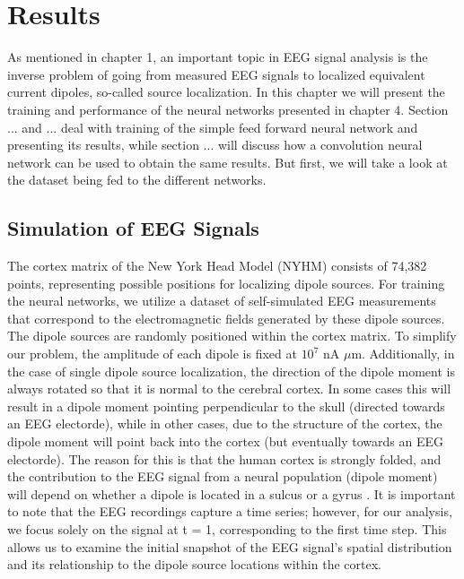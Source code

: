 \documentclass[a4paper, UKenglish, 11pt]{uiomaster}
\begin{document}
\chapter{Results}
As mentioned in chapter 1, an important topic in EEG signal analysis is the inverse problem of going from measured EEG signals to localized equivalent current dipoles, so-called source localization. In this chapter we will present the training and performance of the neural networks presented in chapter 4. Section ... and ... deal with training of the simple feed forward neural network and presenting its results, while section ... will discuss how a convolution neural network can be used to obtain the same results. But first, we will take a look at the dataset being fed to the different networks.

\section{Simulation of EEG Signals}
The cortex matrix of the New York Head Model (NYHM) consists of 74,382 points, representing possible positions for localizing dipole sources. For training the neural networks, we utilize a dataset of self-simulated EEG measurements that correspond to the electromagnetic fields generated by these dipole sources. The dipole sources are randomly positioned within the cortex matrix. To simplify our problem, the amplitude of each dipole is fixed at $10^7$ nA $\mu$m. Additionally,  in the case of single dipole source localization, the direction of the dipole moment is always rotated so that it is normal to the cerebral cortex. In some cases this will result in a dipole moment pointing perpendicular to the skull (directed towards an EEG electorde), while in other cases, due to the structure of the cortex, the dipole moment will point back into the cortex (but eventually towards an EEG electorde). The reason for this is that the human cortex is strongly folded, and the contribution to the EEG signal from a neural population (dipole moment) will depend on whether a dipole is located in a sulcus or a gyrus \cite{naess2021biophysically}. It is important to note that the EEG recordings capture a time series; however, for our analysis, we focus solely on the signal at t = 1, corresponding to the first time step. This allows us to examine the initial snapshot of the EEG signal's spatial distribution and its relationship to the dipole source locations within the cortex.
\end{document}
